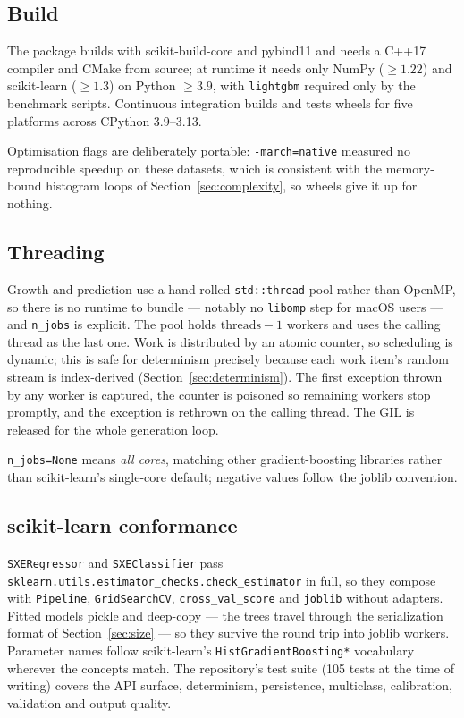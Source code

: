 \documentclass[11pt,a4paper]{article}
\newcommand{\code}[1]{\texttt{\small #1}}
\theoremstyle{definition}
\begin{document}
\subsection{Build}

The package builds with scikit-build-core and pybind11 and needs a C++17
compiler and CMake from source; at runtime it needs only NumPy ($\ge 1.22$) and
scikit-learn ($\ge 1.3$) on Python $\ge 3.9$, with \code{lightgbm} required only
by the benchmark scripts. Continuous integration builds and tests wheels for
five platforms across CPython 3.9--3.13.

Optimisation flags are deliberately portable: \code{-march=native} measured no
reproducible speedup on these datasets, which is consistent with the
memory-bound histogram loops of Section~\ref{sec:complexity}, so wheels give it
up for nothing.

\subsection{Threading}

Growth and prediction use a hand-rolled \code{std::thread} pool rather than
OpenMP, so there is no runtime to bundle --- notably no \code{libomp} step for
macOS users --- and \code{n\_jobs} is explicit. The pool holds
$\text{threads}-1$ workers and uses the calling thread as the last one. Work is
distributed by an atomic counter, so scheduling is dynamic; this is safe for
determinism precisely because each work item's random stream is index-derived
(Section~\ref{sec:determinism}). The first exception thrown by any worker is
captured, the counter is poisoned so remaining workers stop promptly, and the
exception is rethrown on the calling thread. The GIL is released for the whole
generation loop.

\code{n\_jobs=None} means \emph{all cores}, matching other gradient-boosting
libraries rather than scikit-learn's single-core default; negative values follow
the joblib convention.

\subsection{scikit-learn conformance}

\code{SXERegressor} and \code{SXEClassifier} pass
\code{sklearn.utils.estimator\_checks.check\_estimator} in full, so they compose
with \code{Pipeline}, \code{GridSearchCV}, \code{cross\_val\_score} and
\code{joblib} without adapters. Fitted models pickle and deep-copy --- the trees
travel through the serialization format of Section~\ref{sec:size} --- so they
survive the round trip into joblib workers. Parameter names follow
scikit-learn's \code{HistGradientBoosting*} vocabulary wherever the concepts
match. The repository's test suite (105 tests at the time of writing) covers
the API surface, determinism, persistence, multiclass, calibration, validation
and output quality.
\end{document}
